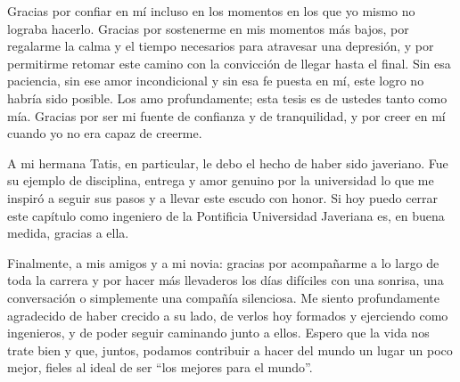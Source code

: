 Gracias por confiar en mí incluso en los momentos en los que yo mismo no lograba hacerlo. Gracias por
sostenerme en mis momentos más bajos, por regalarme la calma y el tiempo necesarios para atravesar una
depresión, y por permitirme retomar este camino con la convicción de llegar hasta el final. Sin esa
paciencia, sin ese amor incondicional y sin esa fe puesta en mí, este logro no habría sido posible. Los amo
profundamente; esta tesis es de ustedes tanto como mía. Gracias por ser mi fuente de confianza y de
tranquilidad, y por creer en mí cuando yo no era capaz de creerme.

A mi hermana Tatis, en particular, le debo el hecho de haber sido javeriano. Fue su ejemplo de disciplina,
entrega y amor genuino por la universidad lo que me inspiró a seguir sus pasos y a llevar este escudo con
honor. Si hoy puedo cerrar este capítulo como ingeniero de la Pontificia Universidad Javeriana es, en buena
medida, gracias a ella.

Finalmente, a mis amigos y a mi novia: gracias por acompañarme a lo largo de toda la carrera y por hacer
más llevaderos los días difíciles con una sonrisa, una conversación o simplemente una compañía silenciosa.
Me siento profundamente agradecido de haber crecido a su lado, de verlos hoy formados y ejerciendo como
ingenieros, y de poder seguir caminando junto a ellos. Espero que la vida nos trate bien y que, juntos,
podamos contribuir a hacer del mundo un lugar un poco mejor, fieles al ideal de ser ``los mejores para el
mundo''.

\newpage
